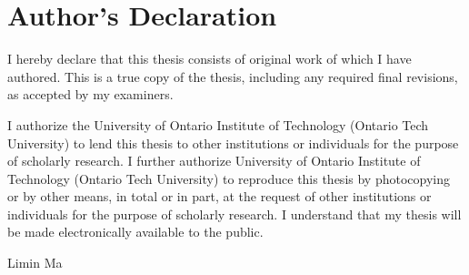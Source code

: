 \chapter*{Author’s Declaration}

I hereby declare that this thesis consists of original work of which I have authored. This is a true copy of the thesis, including any required final revisions, as accepted by my examiners.

I authorize the University of Ontario Institute of Technology (Ontario Tech University) to lend this thesis to other institutions or individuals for the purpose of scholarly research. I further authorize University of Ontario Institute of Technology (Ontario Tech University) to reproduce this thesis by photocopying or by other means, in total or in part, at the request of other institutions or individuals for the purpose of scholarly research. I understand that my thesis will be made electronically available to the public.

\vspace{3cm}

\noindent \underline{\hspace{8cm}} \hspace{1cm} Limin Ma
